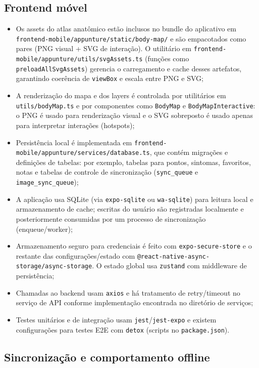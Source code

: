 \subsection{Frontend móvel}

\begin{itemize}
    \item Os assets do atlas anatômico estão inclusos no bundle do aplicativo em \texttt{frontend-mobile/appunture/static/body-map/} e são empacotados como pares (PNG visual + SVG de interação). O utilitário em \texttt{frontend-mobile/appunture/utils/svgAssets.ts} (funções como \texttt{preloadAllSvgAssets}) gerencia o carregamento e cache desses artefatos, garantindo coerência de \texttt{viewBox} e escala entre PNG e SVG;
    \item A renderização do mapa e dos layers é controlada por utilitários em \texttt{utils/bodyMap.ts} e por componentes como \texttt{BodyMap} e \texttt{BodyMapInteractive}: o PNG é usado para renderização visual e o SVG sobreposto é usado apenas para interpretar interações (hotspots);
    \item Persistência local é implementada em \texttt{frontend-mobile/appunture/services/database.ts}, que contém migrações e definições de tabelas: por exemplo, tabelas para pontos, sintomas, favoritos, notas e tabelas de controle de sincronização (\texttt{sync\_queue} e \texttt{image\_sync\_queue});
    \item A aplicação usa SQLite (via \texttt{expo-sqlite} ou \texttt{wa-sqlite}) para leitura local e armazenamento de cache; escritas do usuário são registradas localmente e posteriormente consumidas por um processo de sincronização (enqueue/worker);
    \item Armazenamento seguro para credenciais é feito com \texttt{expo-secure-store} e o restante das configurações/estado com \texttt{@react-native-async-storage/async-storage}. O estado global usa \texttt{zustand} com middleware de persistência;
    \item Chamadas ao backend usam \texttt{axios} e há tratamento de retry/timeout no serviço de API conforme implementação encontrada no diretório de serviços;
    \item Testes unitários e de integração usam \texttt{jest}/\texttt{jest-expo} e existem configurações para testes E2E com \texttt{detox} (scripts no \texttt{package.json}).
\end{itemize}

\subsection{Sincronização e comportamento offline}

